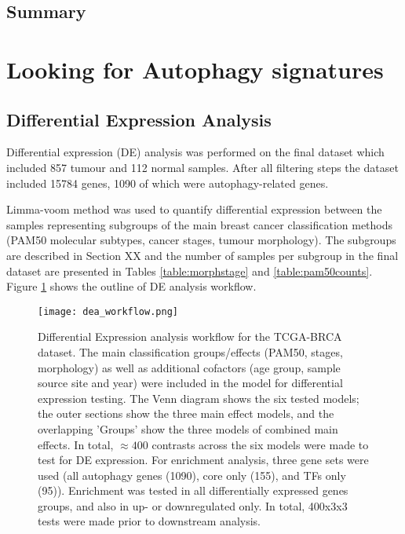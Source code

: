   
    
    

    
    
    \subsection{Summary}
\newpage
\section{Looking for Autophagy signatures}

    \subsection{Differential Expression Analysis}
    
    Differential expression (DE) analysis was performed on the final dataset which included 857 tumour and 112 normal samples. After all filtering steps the dataset included 15784 genes, 1090 of which were autophagy-related genes. 

    Limma-voom method was used to quantify differential expression between the samples representing subgroups of the main breast cancer classification methods (PAM50 molecular subtypes, cancer stages, tumour morphology). The subgroups are described in Section XX and the number of samples per subgroup in the final dataset are presented in Tables \ref{table:morphstage} and \ref{table:pam50counts}. Figure \ref{fig:deaworkflow} shows the outline of DE analysis workflow. 

       
            \begin{figure}[!h]
            \centering
            \texttt{[image: dea\_workflow.png]} 
            \caption{Differential Expression analysis workflow for the TCGA-BRCA dataset. The main classification groups/effects (PAM50, stages, morphology) as well as additional cofactors (age group, sample source site and year) were included in the model for differential expression testing. The Venn diagram shows the six tested models; the outer sections show the three main effect models, and the overlapping 'Groups' show the three models of combined main effects. In total, $\approx 400$ contrasts across the six models were made to test for DE expression. For enrichment analysis, three gene sets were used (all autophagy genes (1090), core only (155), and TFs only (95)). Enrichment was tested in all differentially expressed genes groups, and also in up- or downregulated only. In total, 400x3x3 tests were made prior to downstream analysis.  }
            \label{fig:deaworkflow}
            \end{figure}


